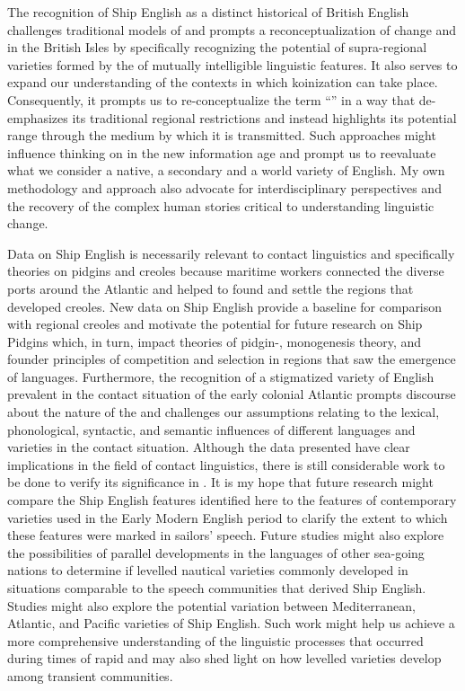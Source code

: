 The recognition of Ship English as a distinct historical  of British English challenges traditional models of  and prompts a reconceptualization of  change and  in the British Isles by specifically recognizing the potential of supra-regional varieties formed by the  of mutually intelligible linguistic features. It also serves to expand our understanding of the contexts in which koinization can take place. Consequently, it prompts us to re-conceptualize the term “” in a way that de-emphasizes its traditional regional restrictions and instead highlights its potential range through the medium by which it is transmitted. Such approaches might influence thinking on  in the new information age and prompt us to reevaluate what we consider a native, a secondary and a world variety of English. My own methodology and approach also advocate for interdisciplinary perspectives and the recovery of the complex human stories critical to understanding linguistic change. 

Data on Ship English is necessarily relevant to contact linguistics and specifically theories on pidgins and creoles because maritime workers connected the diverse ports around the Atlantic and helped to found and settle the regions that developed creoles. New data on Ship English provide a baseline for comparison with regional creoles and motivate the potential for future research on Ship Pidgins which, in turn, impact theories of pidgin-, monogenesis theory, and founder principles of competition and selection in regions that saw the emergence of  languages. Furthermore, the recognition of a stigmatized variety of English prevalent in the contact situation of the early colonial Atlantic prompts discourse about the nature of the  and challenges our assumptions relating to the lexical, phonological, syntactic, and semantic influences of different languages and varieties in the contact situation. Although the data presented have clear implications in the field of contact linguistics, there is still considerable work to be done to verify its significance in . It is my hope that future research might compare the Ship English features identified here to the features of contemporary varieties used in the Early Modern English period to clarify the extent to which these features were marked in sailors’ speech. Future studies might also explore the possibilities of parallel developments in the languages of other sea-going nations to determine if levelled nautical varieties commonly developed in situations comparable to the speech communities that derived Ship English. Studies might also explore the potential variation between Mediterranean, Atlantic, and Pacific varieties of Ship English. Such work might help us achieve a more comprehensive understanding of the linguistic processes that occurred during times of rapid  and may also shed light on how levelled varieties develop among transient communities.  

